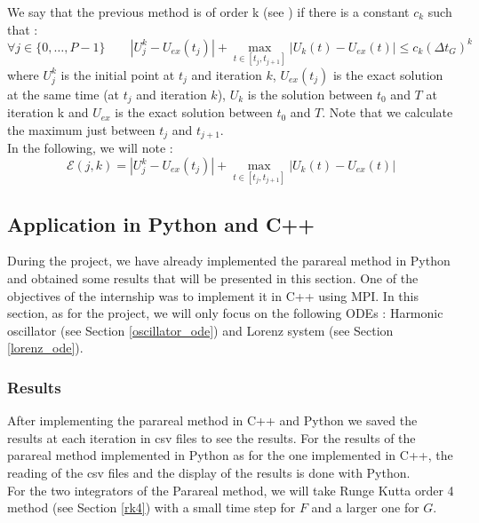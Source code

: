 We say that the previous method is of order k (see \cite{partie2_ref2}) if there is a constant $c_k$ such that :
\begin{equation}
	\forall j\in\{0,\dots,P-1\} \qquad |U_j^k-U_{ex}(t_j)|+\max_{t\in[t_j,t_{j+1}]}|U_k(t)-U_{ex}(t)|\le c_k(\Delta t_G)^k
\end{equation}
where $U_j^k$ is the initial point at $t_j$ and iteration $k$, $U_{ex}(t_j)$ is the exact solution at the same time (at $t_j$ and iteration $k$), $U_k$ is the solution between $t_0$ and $T$ at iteration k and $U_{ex}$ is the exact solution between $t_0$ and $T$. Note that we calculate the maximum just between $t_j$ and $t_{j+1}$. \\

\noindent In the following, we will note : $$\mathcal{E}(j,k)=|U_j^k-U_{ex}(t_j)|+\max_{t\in[t_j,t_{j+1}]}|U_k(t)-U_{ex}(t)|$$



\newpage

\subsection{Application in Python and C++}

During the project, we have already implemented the parareal method in Python and obtained some results that will be presented in this section. One of the objectives of the internship was to implement it in C++ using MPI. In this section, as for the project, we will only focus on the following ODEs : Harmonic oscillator (see Section \ref{oscillator_ode}) and Lorenz system (see Section \ref{lorenz_ode}).

\subsubsection{Results}

After implementing the parareal method in C++ and Python we saved the results at each iteration in csv files to see the results. For the results of the parareal method implemented in Python as for the one implemented in C++, the reading of the csv files and the display of the results is done with Python. \\
For the two integrators of the Parareal method, we will take Runge Kutta order 4 method (see Section \ref{rk4}) with a small time step for $F$ and a larger one for $G$. 

